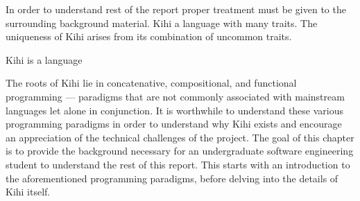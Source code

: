 

In order to understand rest of the report proper treatment must be given to the surrounding background material.  Kihi a language with many traits. The uniqueness of Kihi arises from its combination of uncommon traits.

Kihi is a language 

The roots of Kihi lie in concatenative, compositional, and functional programming --- paradigms that are not commonly associated with mainstream languages let alone in conjunction. It is worthwhile to understand these various programming paradigms in order to understand why Kihi exists and encourage an appreciation of the technical challenges of the project. The goal of this chapter is to provide the background necessary for an undergraduate software engineering student
to understand the rest of this report. This starts with an introduction to the aforementioned programming paradigms, before delving into the details of Kihi itself.